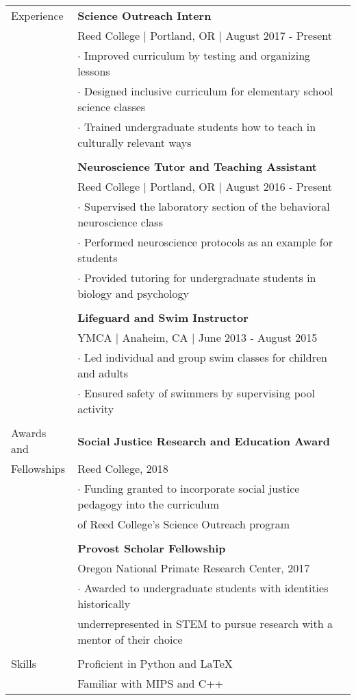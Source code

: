 \documentclass[letterpaper,11pt,oneside]{article}
\begin{document}
\begin{tabular}{@{} l l}
  \Large{Experience}   & \textbf{Science Outreach Intern} \\
     & Reed College $\vert$ Portland, OR $\vert$ August 2017 - Present\\
     & $\cdot$ Improved curriculum by testing and organizing lessons \\
     & $\cdot$ Designed inclusive curriculum for elementary school science classes \\
     & $\cdot$ Trained undergraduate students how to teach in culturally relevant ways \\
     & \\
     & \textbf{Neuroscience Tutor and Teaching Assistant} \\
     & Reed College $\vert$ Portland, OR $\vert$ August 2016 - Present\\
     & $\cdot$ Supervised the laboratory section of the behavioral neuroscience class\\
     & $\cdot$ Performed neuroscience protocols as an example for students \\
     & $\cdot$ Provided tutoring for undergraduate students in biology and psychology\\
     & \\
     & \textbf{Lifeguard and Swim Instructor} \\
     & YMCA $\vert$ Anaheim, CA $\vert$ June 2013 - August 2015\\
     & $\cdot$ Led individual and group swim classes for children and adults\\
     & $\cdot$ Ensured safety of swimmers by supervising pool activity \\
     & \\
 \Large{Awards and }    & \textbf{Social Justice Research and Education Award} \\
  \Large{Fellowships}    & Reed College, 2018 \\
                                     & $\cdot$ Funding granted to incorporate social justice pedagogy into the curriculum \\ & of Reed College's Science Outreach program\\
     & \\
     & \textbf{Provost Scholar Fellowship} \\
     & Oregon National Primate Research Center, 2017 \\
     & $\cdot$ Awarded to undergraduate students with identities historically \\ & underrepresented in STEM to pursue research with a mentor of their choice \\
     & \\
  \Large{Skills}   & Proficient in Python and \LaTeX \\
  			& Familiar with MIPS and C++ \\
\end{tabular}

\newpage
\end{document}
